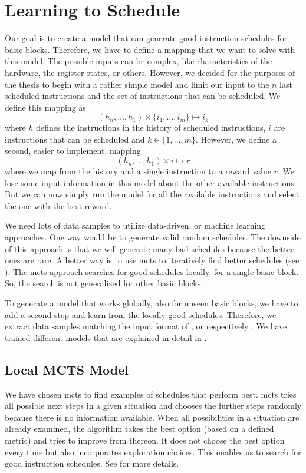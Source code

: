 \section{Learning to Schedule}
\label{sec:approach:ml}
Our goal is to create a model that can generate good instruction schedules for basic blocks.
Therefore, we have to define a mapping that we want to solve with this model.
The possible inputs can be complex, like characteristics of the hardware, the register states, or others.
However, we decided for the purposes of the thesis to begin with a rather simple model and limit our input to the $n$ last scheduled instructions and the set of instructions that can be scheduled.
We define this mapping as
\begin{equation}
    (h_n, \ldots, h_1) \times \{i_1, \ldots, i_m\} \mapsto i_k
    \label{eqn:mlmapping1}
\end{equation}
where $h$ defines the instructions in the history of scheduled instructions, $i$ are instructions that can be scheduled and $k \in \{1, \ldots, m\}$.
However, we define a second, easier to implement, mapping
\begin{equation}
    (h_n, \ldots, h_1) \times i \mapsto r
    \label{eqn:mlmapping2}
\end{equation}
where we map from the history and a single instruction to a reward value $r$.
We lose some input information in this model about the other available instructions.
But we can now simply run the model for all the available instructions and select the one with the best reward.

We need lots of data samples to utilize data-driven, or machine learning approaches.
One way would be to generate valid random schedules.
The downside of this approach is that we will generate many bad schedules because the better ones are rare.
A better way is to use \ac{mcts} to iteratively find better schedules (see ).
The \ac{mcts} approach searches for good schedules locally, \ie for a single basic block.
So, the search is not generalized for other basic blocks.

To generate a model that works globally, \ie also for unseen basic blocks, we have to add a second step and learn from the locally good schedules.
Therefore, we extract data samples matching the input format of , or respectively .
We have trained different models that are explained in detail in .

\subsection{Local MCTS Model}
\label{subsec:bg:ml:mcts}
We have chosen \ac{mcts} to find examples of schedules that perform best.
\ac{mcts} tries all possible next steps in a given situation and chooses the further steps randomly because there is no information available.
When all possibilities in a situation are already examined, the algorithm takes the best option (based on a defined metric) and tries to improve from thereon.
It does not choose the best option every time but also incorporates exploration choices.
This enables us to search for good instruction schedules.
See  for more details.

